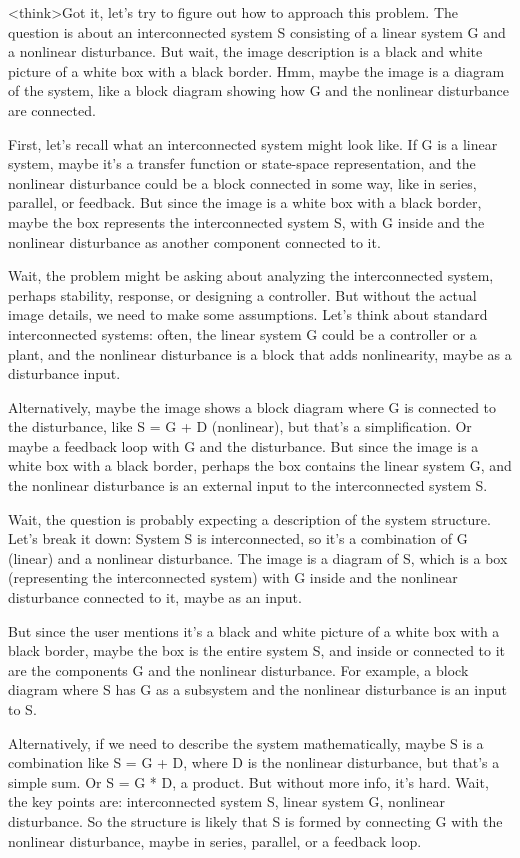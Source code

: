 <think>Got it, let's try to figure out how to approach this problem. The question is about an interconnected system S consisting of a linear system G and a nonlinear disturbance. But wait, the image description is a black and white picture of a white box with a black border. Hmm, maybe the image is a diagram of the system, like a block diagram showing how G and the nonlinear disturbance are connected. 

First, let's recall what an interconnected system might look like. If G is a linear system, maybe it's a transfer function or state-space representation, and the nonlinear disturbance could be a block connected in some way, like in series, parallel, or feedback. But since the image is a white box with a black border, maybe the box represents the interconnected system S, with G inside and the nonlinear disturbance as another component connected to it. 

Wait, the problem might be asking about analyzing the interconnected system, perhaps stability, response, or designing a controller. But without the actual image details, we need to make some assumptions. Let's think about standard interconnected systems: often, the linear system G could be a controller or a plant, and the nonlinear disturbance is a block that adds nonlinearity, maybe as a disturbance input. 

Alternatively, maybe the image shows a block diagram where G is connected to the disturbance, like S = G + D (nonlinear), but that's a simplification. Or maybe a feedback loop with G and the disturbance. But since the image is a white box with a black border, perhaps the box contains the linear system G, and the nonlinear disturbance is an external input to the interconnected system S. 

Wait, the question is probably expecting a description of the system structure. Let's break it down: System S is interconnected, so it's a combination of G (linear) and a nonlinear disturbance. The image is a diagram of S, which is a box (representing the interconnected system) with G inside and the nonlinear disturbance connected to it, maybe as an input. 

But since the user mentions it's a black and white picture of a white box with a black border, maybe the box is the entire system S, and inside or connected to it are the components G and the nonlinear disturbance. For example, a block diagram where S has G as a subsystem and the nonlinear disturbance is an input to S. 

Alternatively, if we need to describe the system mathematically, maybe S is a combination like S = G + D, where D is the nonlinear disturbance, but that's a simple sum. Or S = G * D, a product. But without more info, it's hard. Wait, the key points are: interconnected system S, linear system G, nonlinear disturbance. So the structure is likely that S is formed by connecting G with the nonlinear disturbance, maybe in series, parallel, or a feedback loop. 


